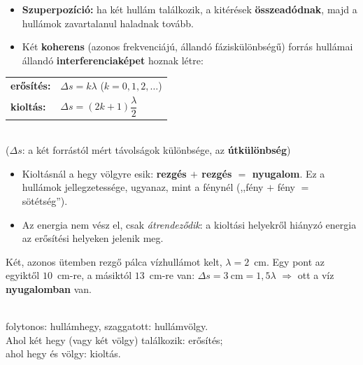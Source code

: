 \documentclass[12pt]{article}
\begin{document}
\begin{minipage}[t]{0.55\linewidth}\vspace{0pt}
\begin{itemize}
  \item \textbf{Szuperpozíció:} ha két hullám találkozik, a kitérések
    \textbf{összeadódnak}, majd a hullámok zavartalanul haladnak tovább.
  \item Két \textbf{koherens} (azonos frekvenciájú, állandó fáziskülönbségű) forrás hullámai
    állandó \textbf{interferenciaképet} hoznak létre:
\end{itemize}
\begin{fontos}
\renewcommand{\arraystretch}{1.6}
\begin{tabular}{@{}ll@{}}
\textbf{erősítés:} & $\Delta s = k\lambda$ \quad ($k = 0, 1, 2, \dots$) \\
\textbf{kioltás:} & $\Delta s = (2k+1)\dfrac{\lambda}{2}$
\end{tabular}\\[2pt]
\centering ($\Delta s$: a két forrástól mért távolságok különbsége, az \textbf{útkülönbség})
\end{fontos}
\begin{itemize}
  \item Kioltásnál a hegy völgyre esik: \textbf{rezgés $+$ rezgés $=$ nyugalom}. Ez a
    hullámok jellegzetessége, ugyanaz, mint a fénynél (,,fény $+$ fény $=$ sötétség'').
  \item Az energia nem vész el, csak \emph{átrendeződik}: a kioltási helyekről hiányzó energia
    az erősítési helyeken jelenik meg.
\end{itemize}
\begin{pelda}
Két, azonos ütemben rezgő pálca vízhullámot kelt, $\lambda = 2$~cm. Egy pont az egyiktől
$10$~cm-re, a másiktól $13$~cm-re van: $\Delta s = 3~\text{cm} = 1{,}5\lambda$ $\Rightarrow$
ott a víz \textbf{nyugalomban} van.
\end{pelda}
\end{minipage}\hfill
\begin{minipage}[t]{0.42\linewidth}\vspace{0pt}\centering
{}\\
{\small folytonos: hullámhegy, szaggatott: hullámvölgy.\\
Ahol két hegy (vagy két völgy) találkozik: erősítés;\\ahol hegy és völgy: kioltás.}
\end{minipage}
\end{document}
